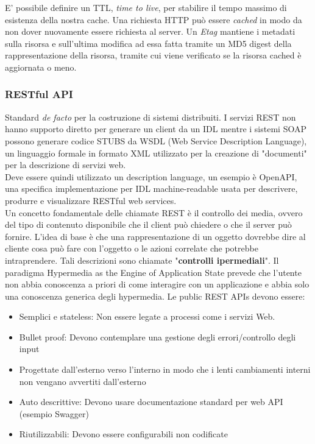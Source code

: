 \documentclass{article}
\begin{document}
		\newpage
		E' possibile definire un TTL, \textit{time to live}, per stabilire il tempo massimo di esistenza della nostra cache. Una richiesta HTTP può essere \textit{cached} in modo da non dover nuovamente essere richiesta al server. 
		Un \textit{Etag} mantiene i metadati sulla risorsa e sull'ultima modifica ad essa fatta tramite un MD5 digest della rappresentazione della risorsa, tramite cui viene verificato se la risorsa cached è aggiornata o meno.

		\subsubsection{RESTful API}
		Standard \textit{de facto} per la costruzione di sistemi distribuiti. 
		I servizi REST non hanno supporto diretto per generare un client da un IDL mentre i sistemi SOAP possono generare codice STUBS da WSDL (Web Service Description Language), un linguaggio formale in formato XML utilizzato per la creazione di "documenti" per la descrizione di servizi web.\\
		Deve essere quindi utilizzato un description language, un esempio è OpenAPI, una specifica implementazione per IDL machine-readable usata per descrivere, produrre e visualizzare RESTful web services.\\
		Un concetto fondamentale delle chiamate REST è il controllo dei media, ovvero del tipo di contenuto disponibile che il client può chiedere o che il server può fornire. 
		L'idea di base è che una rappresentazione di un oggetto dovrebbe dire al cliente cosa può fare con l'oggetto o le azioni correlate che potrebbe intraprendere. 
		Tali descrizioni sono chiamate "\textbf{controlli ipermediali}". Il paradigma Hypermedia as the Engine of Application State prevede che l'utente non abbia conoscenza a priori di come interagire con un applicazione e abbia solo una conoscenza generica degli hypermedia.
		Le public REST APIs devono essere:
		\begin{itemize}
		    \item Semplici e stateless: Non essere legate a processi come i servizi Web.
		    \item Bullet proof: Devono contemplare una gestione degli errori/controllo degli input
		    \item Progettate dall'esterno verso l'interno in modo che i lenti cambiamenti interni non vengano avvertiti dall'esterno
		    \item Auto descrittive: Devono usare documentazione standard per web API (esempio Swagger)
		    \item Riutilizzabili: Devono essere configurabili non codificate
		\end{itemize}
		
\end{document}

